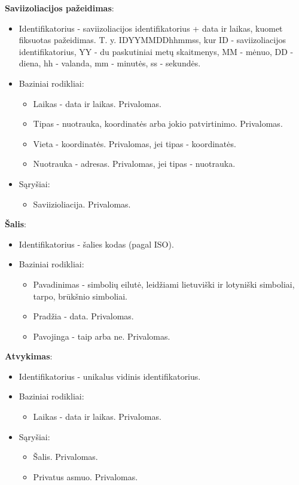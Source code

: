 \documentclass{VUMIFPSkursinis}
\begin{document}
\noindent\textbf{Saviizoliacijos pažeidimas}:
\begin{itemize}
	\item Identifikatorius - saviizoliacijos identifikatorius + data ir laikas, kuomet fiksuotas pažeidimas. T. y. IDYYMMDDhhmmss, kur ID - saviizoliacijos identifikatorius, YY - du paskutiniai metų skaitmenys, MM - mėnuo, DD - diena, hh - valanda, mm - minutės, ss - sekundės.
	\item Baziniai rodikliai:
	\begin{itemize}
		\item Laikas - data ir laikas. Privalomas.
		\item Tipas - nuotrauka, koordinatės arba jokio patvirtinimo. Privalomas.
		\item Vieta - koordinatės. Privalomas, jei tipas - koordinatės.
		\item Nuotrauka - adresas. Privalomas, jei tipas - nuotrauka.
	\end{itemize}
	\item Sąryšiai:
	\begin{itemize}
		\item Saviizioliacija. Privalomas.
	\end{itemize}	
\end{itemize}

\noindent\textbf{Šalis}:
\begin{itemize}
	\item Identifikatorius - šalies kodas (pagal ISO).
	\item Baziniai rodikliai:
	\begin{itemize}
		\item Pavadinimas - simbolių eilutė, leidžiami lietuviški ir lotyniški simboliai, tarpo, brūkšnio simboliai.
		\item Pradžia - data. Privalomas.
		\item Pavojinga - taip arba ne. Privalomas.
	\end{itemize}
\end{itemize}

\noindent\textbf{Atvykimas}:
\begin{itemize}
	\item Identifikatorius - unikalus vidinis identifikatorius.
	\item Baziniai rodikliai:
	\begin{itemize}
		\item Laikas - data ir laikas. Privalomas.
	\end{itemize}
	\item Sąryšiai:
	\begin{itemize}
		\item Šalis. Privalomas.
		\item Privatus asmuo. Privalomas.
	\end{itemize}	
\end{itemize}
\end{document}
